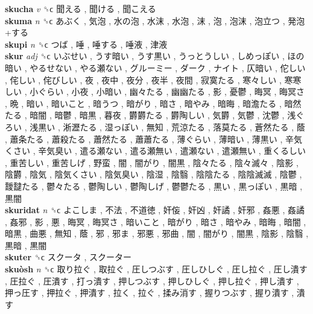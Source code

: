 \textbf{skucha} \emph{v}  ␝ϲ   聞える ,  聞ける ,  聞こえる   \\
\textbf{skuma} \emph{n}  ␝ϲ   あぶく ,  気泡 ,  水の泡 ,  水沫 ,  水泡 ,  沫 ,  泡 ,  泡沫 ,  泡立つ ,  発泡+する   \\
\textbf{skupi} \emph{n}  ␝ϲ   つば ,  唾 ,  唾する ,  唾液 ,  津液   \\
\textbf{skur} \emph{adj}  ␝ϲ   いぶせい ,  うす暗い ,  うす黒い ,  うっとうしい ,  しめっぽい ,  ほの暗い ,  やるせない ,  やる瀬ない ,  グルーミー ,  ダーク ,  ナイト ,  仄暗い ,  佗しい ,  侘しい ,  侘びしい ,  夜 ,  夜中 ,  夜分 ,  夜半 ,  夜間 ,  寂寞たる ,  寒々しい ,  寒寒しい ,  小ぐらい ,  小夜 ,  小暗い ,  幽々たる ,  幽幽たる ,  影 ,  憂鬱 ,  晦冥 ,  晦冥さ ,  晩 ,  暗い ,  暗いこと ,  暗うつ ,  暗がり ,  暗さ ,  暗やみ ,  暗晦 ,  暗澹たる ,  暗然たる ,  暗闇 ,  暗鬱 ,  暗黒 ,  暮夜 ,  欝欝たる ,  欝陶しい ,  気欝 ,  気鬱 ,  沈鬱 ,  浅ぐろい ,  浅黒い ,  淅瀝たる ,  湿っぽい ,  無知 ,  荒涼たる ,  落莫たる ,  蒼然たる ,  蔭 ,  蕭条たる ,  蕭殺たる ,  蕭然たる ,  蕭蕭たる ,  薄ぐらい ,  薄暗い ,  薄黒い ,  辛気くさい ,  辛気臭い ,  遣る瀬ない ,  遣る瀬無い ,  遣瀬ない ,  遣瀬無い ,  重くるしい ,  重苦しい ,  重苦しげ ,  野蛮 ,  闇 ,  闇がり ,  闇黒 ,  陰々たる ,  陰々滅々 ,  陰影 ,  陰欝 ,  陰気 ,  陰気くさい ,  陰気臭い ,  陰湿 ,  陰翳 ,  陰陰たる ,  陰陰滅滅 ,  陰鬱 ,  靉靆たる ,  鬱々たる ,  鬱陶しい ,  鬱陶しげ ,  鬱鬱たる ,  黒い ,  黒っぽい ,  黒暗 ,  黒闇   \\
\textbf{skuridat} \emph{n}  ␝ϲ   よこしま ,  不法 ,  不道徳 ,  奸侫 ,  奸凶 ,  奸譎 ,  奸邪 ,  姦悪 ,  姦譎 ,  姦邪 ,  影 ,  悪 ,  晦冥 ,  晦冥さ ,  暗いこと ,  暗がり ,  暗さ ,  暗やみ ,  暗晦 ,  暗闇 ,  暗黒 ,  曲悪 ,  無知 ,  蔭 ,  邪 ,  邪ま ,  邪悪 ,  邪曲 ,  闇 ,  闇がり ,  闇黒 ,  陰影 ,  陰翳 ,  黒暗 ,  黒闇   \\
\textbf{skuter} ␝ϲ   スクータ ,  スクーター   \\
\textbf{skuòsh} \emph{n}  ␝ϲ   取り拉ぐ ,  取拉ぐ ,  圧しつぶす ,  圧しひしぐ ,  圧し拉ぐ ,  圧し潰す ,  圧拉ぐ ,  圧潰す ,  打っ潰す ,  押しつぶす ,  押しひしぐ ,  押し拉ぐ ,  押し潰す ,  押っ圧す ,  押拉ぐ ,  押潰す ,  拉く ,  拉ぐ ,  揉み消す ,  握りつぶす ,  握り潰す ,  潰す   \\
